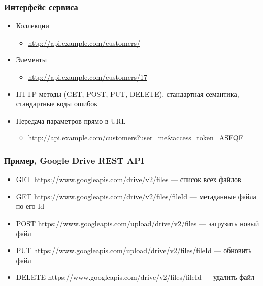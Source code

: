 \documentclass{../../slides-style}
\begin{document}
    \begin{frame}
        \frametitle{Интерфейс сервиса}
        \begin{itemize}
            \item Коллекции
            \begin{itemize}
                \item \url{http://api.example.com/customers/}
            \end{itemize}
            \item Элементы
            \begin{itemize}
                \item \url{http://api.example.com/customers/17}
            \end{itemize}
            \item HTTP-методы (GET, POST, PUT, DELETE), стандартная семантика, стандартные коды ошибок
            \item Передача параметров прямо в URL
            \begin{itemize}
                \item \url{http://api.example.com/customers?user=me&access_token=ASFQF}
            \end{itemize}
        \end{itemize}
    \end{frame}

    \begin{frame}
        \frametitle{Пример, Google Drive REST API}
        \begin{itemize}
            \item GET https://www.googleapis.com/drive/v2/files --- список всех файлов
            \item GET https://www.googleapis.com/drive/v2/files/fileId --- метаданные файла по его Id
            \item POST https://www.googleapis.com/upload/drive/v2/files — загрузить новый файл
            \item PUT https://www.googleapis.com/upload/drive/v2/files/fileId --- обновить файл
            \item DELETE https://www.googleapis.com/drive/v2/files/fileId --- удалить файл
        \end{itemize}
    \end{frame}
\end{document}
